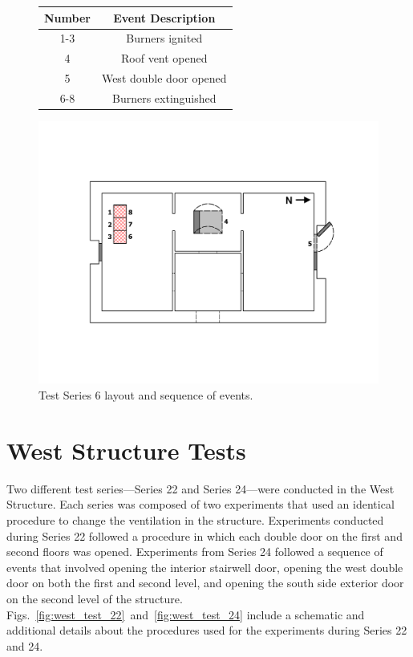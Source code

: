 \documentclass[12pt,oneside]{book}
\begin{document}
\begin{figure}[!ht]
\begin{minipage}[b]{0.8\columnwidth}
	\begin{flushleft}
	\small
	\begin{tabular}[b]{cc}
 	\toprule
 	\textbf{Number} & \textbf{Event Description} \\
 	\midrule
 	1-3  & Burners ignited \\
 	4	 & Roof vent opened \\
 	5 	 & West double door opened \\
 	6-8  & Burners extinguished \\
	\bottomrule
	\end{tabular}
	\end{flushleft}
\end{minipage}
\begin{minipage}[b]{0.9\columnwidth}
	\vspace{15pt}
	\centering
	\includegraphics[width=\columnwidth]{../Figures/Floor_Plans/East_Structure_Test_6}
\end{minipage}
\caption{Test Series 6 layout and sequence of events.}
\label{fig:east_test_6}
\end{figure}
\FloatBarrier

\section{West Structure Tests}
\label{sec:west_procedure}
Two different test series---Series 22 and Series 24---were conducted in the West Structure. Each series was composed of two experiments that used an identical procedure to change the ventilation in the structure. Experiments conducted during Series 22 followed a procedure in which each double door on the first and second floors was opened. Experiments from Series 24 followed a sequence of events that involved opening the interior stairwell door, opening the west double door on both the first and second level, and opening the south side exterior door on the second level of the structure. Figs.~\ref{fig:west_test_22}~and~\ref{fig:west_test_24} include a schematic and additional details about the procedures used for the experiments during Series 22 and 24.
\end{document}
